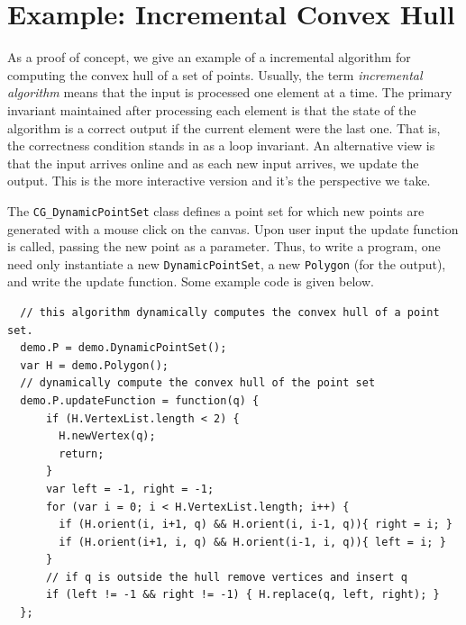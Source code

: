 \documentclass[a4paper,UKenglish]{lipics-v2016}
\begin{document}

\section{Example: Incremental Convex Hull} %
\label{sec:example_incremental_convex_hull}
  
  As a proof of concept, we give an example of a incremental algorithm for computing the convex hull of a set of points.
  Usually, the term \emph{incremental algorithm} means that the input is processed one element at a time.
  The primary invariant maintained after processing each element is that the state of the algorithm is a correct output if the current element were the last one.
  That is, the correctness condition stands in as a loop invariant.  
  An alternative view is that the input arrives online and as each new input arrives, we update the output.
  This is the more interactive version and it's the perspective we take.

  The \texttt{CG\_DynamicPointSet} class defines a point set for which new points are generated with a mouse click on the canvas.
  Upon user input the update function is called, passing the new point as a parameter.
  Thus, to write a program, one need only instantiate a new \texttt{DynamicPointSet}, a new \texttt{Polygon} (for the output), and write the update function.
  Some example code is given below.

\begin{verbatim}
  // this algorithm dynamically computes the convex hull of a point set.  
  demo.P = demo.DynamicPointSet();
  var H = demo.Polygon();
  // dynamically compute the convex hull of the point set
  demo.P.updateFunction = function(q) {
      if (H.VertexList.length < 2) {
        H.newVertex(q);
        return;
      }
      var left = -1, right = -1;
      for (var i = 0; i < H.VertexList.length; i++) {
        if (H.orient(i, i+1, q) && H.orient(i, i-1, q)){ right = i; }
        if (H.orient(i+1, i, q) && H.orient(i-1, i, q)){ left = i; }
      }
      // if q is outside the hull remove vertices and insert q
      if (left != -1 && right != -1) { H.replace(q, left, right); }
  };
\end{verbatim}
\end{document}
